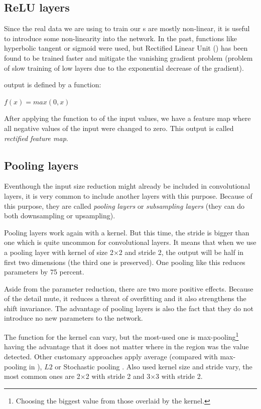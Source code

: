 \subsection{ReLU layers}
\label{relu-layers}

Since the real data we are using to train our s are mostly non-linear, it is useful to introduce some non-linearity into the network. In the past, functions like hyperbolic tangent or sigmoid were used, but Rectified Linear Unit () has been found to be trained faster and mitigate the vanishing gradient problem (problem of slow training of low layers due to the exponential decrease of the gradient). 

 output is defined by a function:

$f(x) = max(0, x)$

After applying the  function to of the input values, we have a feature map where all negative values of the input were changed to zero. This output is called \textit{rectified feature map}. 

\subsection{Pooling layers}
\label{pooling}

Eventhough the input size reduction might already be included in convolutional layers, it is very common to include another layers with this purpose. Because of this purpose, they are called \textit{pooling layers} or \textit{subsampling layers} (they can do both downsampling or upsampling). 

Pooling layers work again with a kernel. But this time, the stride is bigger than one which is quite uncommon for convolutional layers. It means that when we use a pooling layer with kernel of size 2$\times$2 and stride 2, the output will be half in first two dimensions (the third one is preserved). One pooling like this reduces parameters by 75 percent. 

Aside from the parameter reduction, there are two more positive effects. Because of the detail mute, it reduces a threat of overfitting and it also strengthens the shift invariance. The advantage of pooling layers is also the fact that they do not introduce no new parameters to the network. 

The function for the kernel can vary, but the most-used one is max-pooling\footnote{Choosing the biggest value from those overlaid by the kernel.} having the advantage that it does not matter where in the region was the value detected. Other customary approaches apply average (compared with max-pooling in \cite{avg-pooling}), $L2$ \cite{l2-pooling} or Stochastic pooling \cite{stoch-pooling}. Also used kernel size and stride vary, the most common ones are 2$\times$2 with stride 2 and 3$\times$3 with stride 2. 


